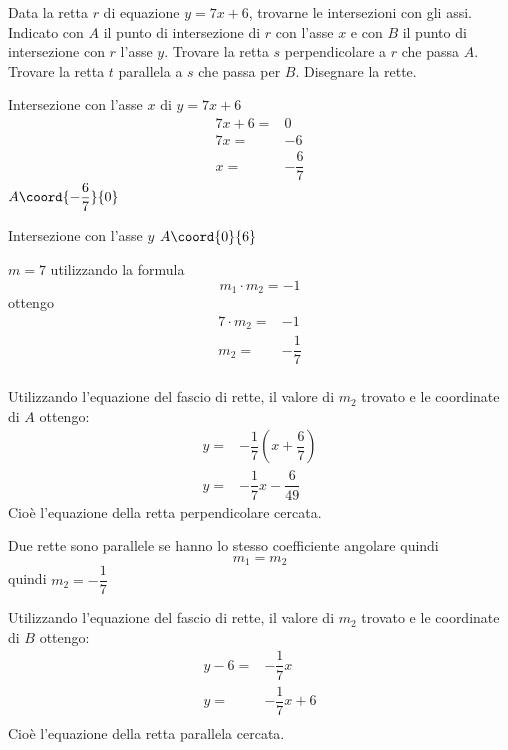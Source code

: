 Data la retta $r$ di equazione $y=7x+6$, trovarne le intersezioni con gli assi. Indicato con $A$ il punto di intersezione di $r$ con l'asse $x$ e con $B$ il punto di intersezione con $r$ l'asse $y$. Trovare la retta $s$ perpendicolare a $r$ che passa $A$.
Trovare la retta $t$ parallela a $s$ che passa per $B$. Disegnare la rette.

Intersezione con l'asse $x$ di $y=7x+6$
\begin{align*}
7x+6=&0\\
7x=&-6\\
x=&-\dfrac{6}{7}
\end{align*}
 $A\coord{-\dfrac{6}{7}}{0}$

 Intersezione con l'asse $y$
  $A\coord{0}{6}$

 	$m=7$ utilizzando la formula \[m_1\cdot m_2=-1\] ottengo
 	\begin{align*}
 	7\cdot m_2=&-1\\
 	m_2=&-\dfrac{1}{7}\\
 \end{align*}

 	Utilizzando l'equazione del fascio di rette, il valore di $m_2$ trovato e le coordinate di $A$ ottengo:
 	\begin{align*}
 	y=&-\dfrac{1}{7}(x+\dfrac{6}{7})\\
 	y=&-\dfrac{1}{7}x-\dfrac{6}{49}
 	\end{align*}
 	Cioè l'equazione della retta perpendicolare cercata.

	Due rette sono parallele se hanno lo stesso coefficiente angolare quindi \[m_1=m_2 \]
	quindi $m_2=-\dfrac{1}{7}$

	Utilizzando l'equazione del fascio di rette, il valore di $m_2$ trovato e le coordinate di $B$ ottengo:
	\begin{align*}
	y-6=&-\dfrac{1}{7}x\\
	y=&-\dfrac{1}{7}x+6\\
	\end{align*}
	Cioè l'equazione della retta parallela cercata.
		\begin{center}
			
		\end{center}
